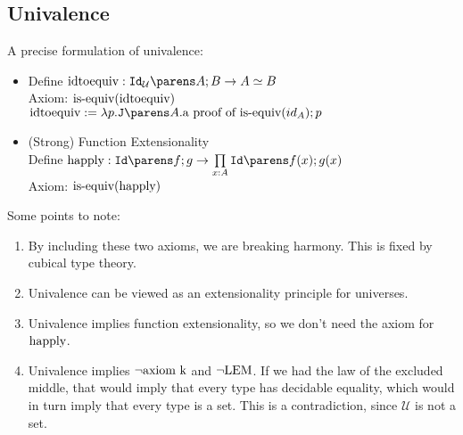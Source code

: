 \documentclass[11pt]{article}
\newcommand{\U}{\ensuremath{\mathcal{U}}}
\newcommand{\isequiv}[1]{\ensuremath{\textnormal{is-equiv}(#1)}}
\newcommand{\idtoequiv}{\textnormal{idtoequiv}}
\newcommand{\funapp}{\textnormal{happly}}
\begin{document}
\subsection{Univalence}
A precise formulation of univalence:
\begin{itemize}
\item Define $\oftype{\idtoequiv}{\idtype{\U}{A}{B} \rightarrow A \simeq B}$ \\
  Axiom:  $\isequiv{\idtoequiv}$ \\
  $\idtoequiv := \lambda p.\idJ{A}{\textnormal{a proof of \isequiv{id_A}}}{p}$

\item (Strong) Function Extensionality \\
  Define $\oftype{\funapp}{\idtype{f}{g}} \rightarrow \dfuntype{x}{A}{\idtype{f(x)}{g(x)}}$ \\
  Axiom:  $\isequiv{\funapp}$
\end{itemize}

Some points to note:
\begin{enumerate}
\item By including these two axioms, we are breaking harmony.  This is
  fixed by cubical type theory.
\item Univalence can be viewed as an extensionality principle for
  universes.
\item Univalence implies function extensionality, so we don't need the
  axiom for $\funapp$.
\item Univalence implies $\lnot\textnormal{axiom k}$ and
  $\lnot\textnormal{LEM}$.  If we had the law of the excluded
  middle, that would imply that every type has decidable equality,
  which would in turn imply that every type is a set.  This is a
  contradiction, since \U{} is not a set.
\end{enumerate}


\printbibliography
\end{document}
